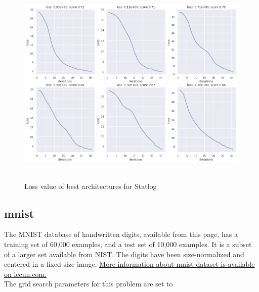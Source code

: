 \documentclass[10pt]{SelfArx} %
\begin{document}
	\begin{figure}\centering
		\includegraphics[width=1.79\columnwidth, height=10cm]{img/statlog-plots1}
		\caption{Loss value of best architectures for Statlog}
		\label{fsatlog}
	\end{figure}
	
	\subsection{mnist}
	The MNIST database of handwritten digits, available from this page, has a training set of 60,000 examples, and a test set of 10,000 examples. It is a subset of a larger set available from NIST. The digits have been size-normalized and centered in a fixed-size image. \href{http://yann.lecun.com/exdb/mnist/}{More information about mnist dataset is available on lecun.com.}
	\\
	The grid search parameters for this problem are set to
	
\end{document}
